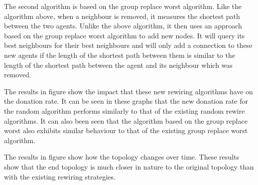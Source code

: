 The second algorithm is based on the group replace worst algorithm. Like the algorithm above, when a neighbour is removed, it measures the shortest path between the two agents. Unlike the above algorithm, it then uses an approach based on the group replace worst algorithm to add new nodes. It will query its best neighbours for their best neighbours and will only add a connection to these new agents if the length of the shortest path between them is similar to the length of the shortest path between the agent and its neighbour which was removed.

The results in figure show the impact that these new rewiring algorithms have on the donation rate. It can be seen in these graphs that the new donation rate for the random algorithm performs similarly to that of the existing random rewire algorithms. It can also been seen that the algorithm based on the group replace worst also exhibits similar behaviour to that of the existing group replace worst algorithm.

The results in figure show how the topology changes over time. These results show that the end topology is much closer in nature to the original topology than with the existing rewiring strategies.